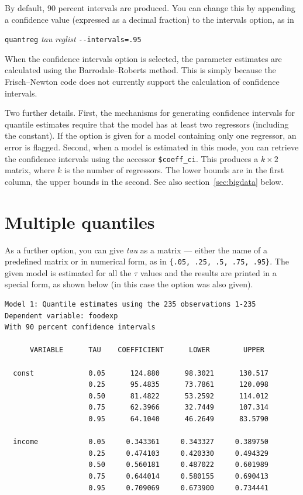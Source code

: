 By default, 90 percent intervals are produced.  You can change this by
appending a confidence value (expressed as a decimal fraction) to the
intervals option, as in

\vspace{1em}
\noindent
\qquad \texttt{quantreg} \textsl{tau} \textsl{reglist} \verb|--intervals=.95|
\vspace{1em}

When the confidence intervals option is selected, the parameter
estimates are calculated using the Barrodale--Roberts method.  This is
simply because the Frisch--Newton code does not currently support the
calculation of confidence intervals.

Two further details.  First, the mechanisms for generating confidence
intervals for quantile estimates require that the model has at least
two regressors (including the constant).  If the 
option is given for a model containing only one regressor, an error is
flagged.  Second, when a model is estimated in this mode, you can
retrieve the confidence intervals using the accessor \verb|$coeff_ci|.
This produces a $k \times 2$ matrix, where $k$ is the number of
regressors.  The lower bounds are in the first column, the upper
bounds in the second.  See also section~\ref{sec:bigdata} below.

\section{Multiple quantiles}

As a further option, you can give \textsl{tau} as a matrix --- either
the name of a predefined matrix or in numerical form, as in
\verb+{.05, .25, .5, .75, .95}+.  The given model is estimated for all
the $\tau$ values and the results are printed in a special form, as
shown below (in this case the  option was also
given).

{\small
\begin{verbatim}
Model 1: Quantile estimates using the 235 observations 1-235
Dependent variable: foodexp
With 90 percent confidence intervals

      VARIABLE      TAU    COEFFICIENT      LOWER        UPPER

  const             0.05      124.880      98.3021      130.517
                    0.25      95.4835      73.7861      120.098
                    0.50      81.4822      53.2592      114.012
                    0.75      62.3966      32.7449      107.314
                    0.95      64.1040      46.2649      83.5790

  income            0.05     0.343361     0.343327     0.389750
                    0.25     0.474103     0.420330     0.494329
                    0.50     0.560181     0.487022     0.601989
                    0.75     0.644014     0.580155     0.690413
                    0.95     0.709069     0.673900     0.734441
\end{verbatim}
}

